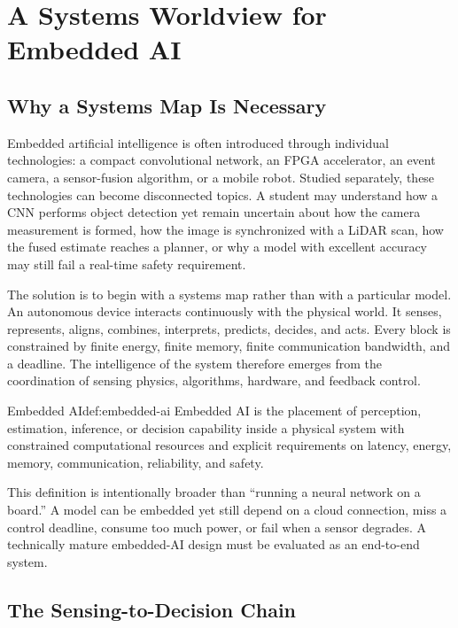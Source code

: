 \chapter{A Systems Worldview for Embedded AI}
\label{chap:worldview}

\section{Why a Systems Map Is Necessary}

Embedded artificial intelligence is often introduced through individual technologies: a compact convolutional network, an FPGA accelerator, an event camera, a sensor-fusion algorithm, or a mobile robot. Studied separately, these technologies can become disconnected topics. A student may understand how a CNN performs object detection yet remain uncertain about how the camera measurement is formed, how the image is synchronized with a LiDAR scan, how the fused estimate reaches a planner, or why a model with excellent accuracy may still fail a real-time safety requirement.

The solution is to begin with a systems map rather than with a particular model. An autonomous device interacts continuously with the physical world. It senses, represents, aligns, combines, interprets, predicts, decides, and acts. Every block is constrained by finite energy, finite memory, finite communication bandwidth, and a deadline. The intelligence of the system therefore emerges from the coordination of sensing physics, algorithms, hardware, and feedback control.

\begin{definition}{Embedded AI}{def:embedded-ai}
Embedded AI is the placement of perception, estimation, inference, or decision capability inside a physical system with constrained computational resources and explicit requirements on latency, energy, memory, communication, reliability, and safety.
\end{definition}

This definition is intentionally broader than ``running a neural network on a board.'' A model can be embedded yet still depend on a cloud connection, miss a control deadline, consume too much power, or fail when a sensor degrades. A technically mature embedded-AI design must be evaluated as an end-to-end system.

\section{The Sensing-to-Decision Chain}

